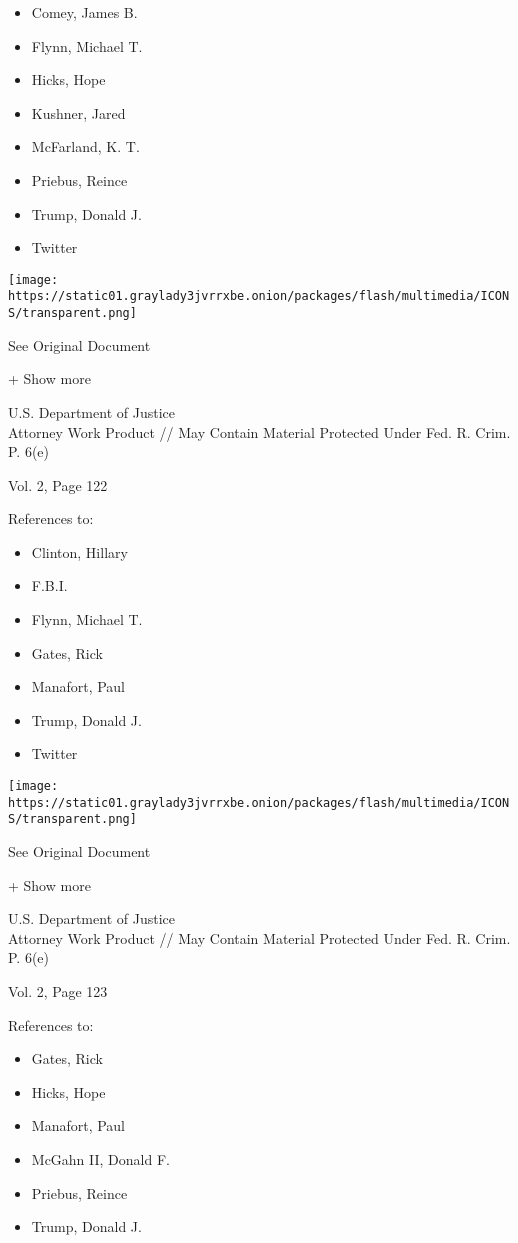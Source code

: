 \begin{itemize}
\tightlist
\item
  Comey, James B.
\item
  Flynn, Michael T.
\item
  Hicks, Hope
\item
  Kushner, Jared
\item
  McFarland, K. T.
\item
  Priebus, Reince
\item
  Trump, Donald J.
\item
  Twitter
\end{itemize}

\protect\hyperlink{}{}

\texttt{[image: https://static01.graylady3jvrrxbe.onion/packages/flash/multimedia/ICONS/transparent.png]}

See Original Document

+ Show more

U.S. Department of Justice\\
Attorney Work Product // May Contain Material Protected Under Fed. R.
Crim. P. 6(e)

Vol. 2, Page 122

References to:

\begin{itemize}
\tightlist
\item
  Clinton, Hillary
\item
  F.B.I.
\item
  Flynn, Michael T.
\item
  Gates, Rick
\item
  Manafort, Paul 
\item
  Trump, Donald J.
\item
  Twitter
\end{itemize}

\protect\hyperlink{}{}

\texttt{[image: https://static01.graylady3jvrrxbe.onion/packages/flash/multimedia/ICONS/transparent.png]}

See Original Document

+ Show more

U.S. Department of Justice\\
Attorney Work Product // May Contain Material Protected Under Fed. R.
Crim. P. 6(e)

Vol. 2, Page 123

References to:

\begin{itemize}
\tightlist
\item
  Gates, Rick
\item
  Hicks, Hope
\item
  Manafort, Paul 
\item
  McGahn II, Donald F.
\item
  Priebus, Reince
\item
  Trump, Donald J.
\end{itemize}

